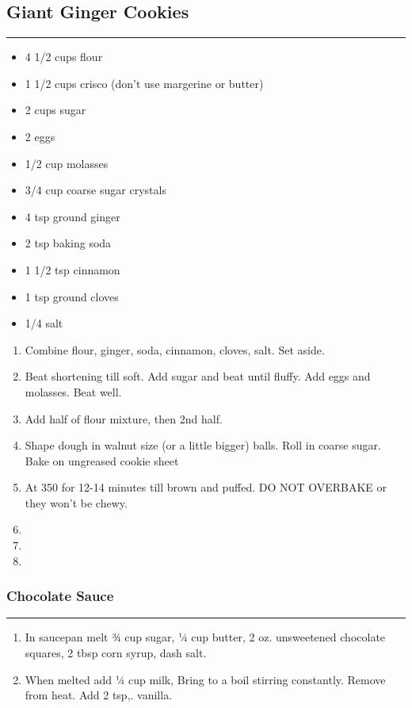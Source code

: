 \documentclass{article}
\begin{document}
\subsection{Giant Ginger Cookies} 
\noindent\rule[0.5ex]{\linewidth}{1pt}

\begin{framed}
    \begin{itemize}
        \item 4 1/2 cups flour
        \item 1 1/2 cups crisco (don't use margerine or butter)
        \item 2 cups sugar
        \item 2 eggs
        \item 1/2 cup molasses
        \item 3/4 cup coarse sugar crystals
        \item 4 tsp ground ginger
        \item 2 tsp baking soda 
        \item 1 1/2 tsp cinnamon
        \item 1 tsp ground cloves
        \item 1/4 salt
    \end{itemize}
\end{framed}

\begin{enumerate}
    \item
        Combine flour, ginger, soda, cinnamon, cloves, salt. Set aside.
    \item
        Beat shortening till soft. Add sugar and beat until fluffy. Add eggs and molasses. Beat well.
    \item
        Add half of flour mixture, then 2nd half.
    \item
        Shape dough in walnut size (or a little bigger) balls. Roll in coarse sugar. Bake on ungreased cookie sheet
    \item
        At 350 for 12-14 minutes till brown and puffed. DO NOT OVERBAKE or they won’t be chewy.
    \item
    \item
    \item
\end{enumerate}

\subsubsection{Chocolate Sauce} 
\noindent\rule[0.5ex]{\linewidth}{0.5pt}
\begin{enumerate}
    \item
        In saucepan melt ¾ cup sugar, ¼ cup butter, 2 oz. unsweetened chocolate squares, 2 tbsp corn syrup, dash salt.
    \item
        When melted add ¼ cup milk, Bring to a boil stirring constantly. Remove from heat. Add 2 tsp,. vanilla.
\end{enumerate}
\newpage
\end{document}
